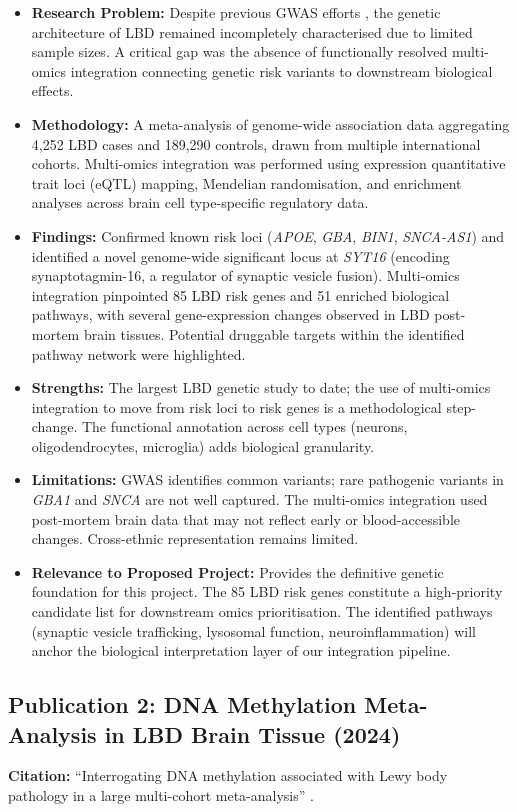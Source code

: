 \begin{itemize}
    \item \textbf{Research Problem:} Despite previous GWAS efforts \cite{chia2021lbd}, the genetic architecture of LBD remained incompletely characterised due to limited sample sizes. A critical gap was the absence of functionally resolved multi-omics integration connecting genetic risk variants to downstream biological effects.
    \item \textbf{Methodology:} A meta-analysis of genome-wide association data aggregating 4,252 LBD cases and 189,290 controls, drawn from multiple international cohorts. Multi-omics integration was performed using expression quantitative trait loci (eQTL) mapping, Mendelian randomisation, and enrichment analyses across brain cell type-specific regulatory data.
    \item \textbf{Findings:} Confirmed known risk loci (\textit{APOE}, \textit{GBA}, \textit{BIN1}, \textit{SNCA-AS1}) and identified a novel genome-wide significant locus at \textit{SYT16} (encoding synaptotagmin-16, a regulator of synaptic vesicle fusion). Multi-omics integration pinpointed 85 LBD risk genes and 51 enriched biological pathways, with several gene-expression changes observed in LBD post-mortem brain tissues. Potential druggable targets within the identified pathway network were highlighted.
    \item \textbf{Strengths:} The largest LBD genetic study to date; the use of multi-omics integration to move from risk loci to risk genes is a methodological step-change. The functional annotation across cell types (neurons, oligodendrocytes, microglia) adds biological granularity.
    \item \textbf{Limitations:} GWAS identifies common variants; rare pathogenic variants in \textit{GBA1} and \textit{SNCA} are not well captured. The multi-omics integration used post-mortem brain data that may not reflect early or blood-accessible changes. Cross-ethnic representation remains limited.
    \item \textbf{Relevance to Proposed Project:} Provides the definitive genetic foundation for this project. The 85 LBD risk genes constitute a high-priority candidate list for downstream omics prioritisation. The identified pathways (synaptic vesicle trafficking, lysosomal function, neuroinflammation) will anchor the biological interpretation layer of our integration pipeline.
\end{itemize}

\subsection{Publication 2: DNA Methylation Meta-Analysis in LBD Brain Tissue (2024)}
\textbf{Citation:} ``Interrogating DNA methylation associated with Lewy body pathology in a large multi-cohort meta-analysis'' \cite{nabais2024methylation}.


